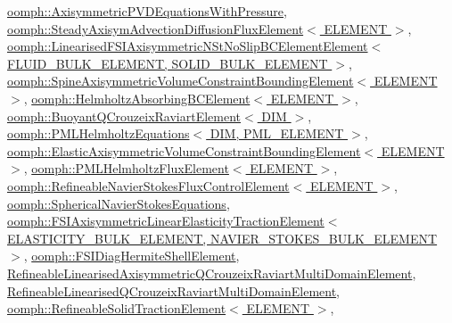 \hyperlink{classoomph_1_1AxisymmetricPVDEquationsWithPressure_a43c81b1695c9cd22b7546dd7764b70bd}{oomph\+::\+Axisymmetric\+P\+V\+D\+Equations\+With\+Pressure}, \hyperlink{classoomph_1_1SteadyAxisymAdvectionDiffusionFluxElement_aa23b0478cb2937ac6e0668136befac27}{oomph\+::\+Steady\+Axisym\+Advection\+Diffusion\+Flux\+Element$<$ E\+L\+E\+M\+E\+N\+T $>$}, \hyperlink{classoomph_1_1LinearisedFSIAxisymmetricNStNoSlipBCElementElement_ad03af0befd909bc87f3bd5e8fb93c97b}{oomph\+::\+Linearised\+F\+S\+I\+Axisymmetric\+N\+St\+No\+Slip\+B\+C\+Element\+Element$<$ F\+L\+U\+I\+D\+\_\+\+B\+U\+L\+K\+\_\+\+E\+L\+E\+M\+E\+N\+T, S\+O\+L\+I\+D\+\_\+\+B\+U\+L\+K\+\_\+\+E\+L\+E\+M\+E\+N\+T $>$}, \hyperlink{classoomph_1_1SpineAxisymmetricVolumeConstraintBoundingElement_a5813860802c0474ef6ff5f249ca7141f}{oomph\+::\+Spine\+Axisymmetric\+Volume\+Constraint\+Bounding\+Element$<$ E\+L\+E\+M\+E\+N\+T $>$}, \hyperlink{classoomph_1_1HelmholtzAbsorbingBCElement_a2ddc7be679d396847964aed6d545e168}{oomph\+::\+Helmholtz\+Absorbing\+B\+C\+Element$<$ E\+L\+E\+M\+E\+N\+T $>$}, \hyperlink{classoomph_1_1BuoyantQCrouzeixRaviartElement_a7bd9313dd697c1219cee4a65692388b5}{oomph\+::\+Buoyant\+Q\+Crouzeix\+Raviart\+Element$<$ D\+I\+M $>$}, \hyperlink{classoomph_1_1PMLHelmholtzEquations_a93c2495dc0dd513b51ef77b2e3a7020a}{oomph\+::\+P\+M\+L\+Helmholtz\+Equations$<$ D\+I\+M, P\+M\+L\+\_\+\+E\+L\+E\+M\+E\+N\+T $>$}, \hyperlink{classoomph_1_1ElasticAxisymmetricVolumeConstraintBoundingElement_adc7f5296f867251fe4b97b01f40c11e7}{oomph\+::\+Elastic\+Axisymmetric\+Volume\+Constraint\+Bounding\+Element$<$ E\+L\+E\+M\+E\+N\+T $>$}, \hyperlink{classoomph_1_1PMLHelmholtzFluxElement_a1d3dd847de79b9758b9bdd40dcbcda3c}{oomph\+::\+P\+M\+L\+Helmholtz\+Flux\+Element$<$ E\+L\+E\+M\+E\+N\+T $>$}, \hyperlink{classoomph_1_1RefineableNavierStokesFluxControlElement_a46659967091dc0f672d91f2ac339c304}{oomph\+::\+Refineable\+Navier\+Stokes\+Flux\+Control\+Element$<$ E\+L\+E\+M\+E\+N\+T $>$}, \hyperlink{classoomph_1_1SphericalNavierStokesEquations_a518de36d4b06dcd38ab7e18a89f40e9f}{oomph\+::\+Spherical\+Navier\+Stokes\+Equations}, \hyperlink{classoomph_1_1FSIAxisymmetricLinearElasticityTractionElement_ac2ec9591abe96af1cc68da123c554feb}{oomph\+::\+F\+S\+I\+Axisymmetric\+Linear\+Elasticity\+Traction\+Element$<$ E\+L\+A\+S\+T\+I\+C\+I\+T\+Y\+\_\+\+B\+U\+L\+K\+\_\+\+E\+L\+E\+M\+E\+N\+T, N\+A\+V\+I\+E\+R\+\_\+\+S\+T\+O\+K\+E\+S\+\_\+\+B\+U\+L\+K\+\_\+\+E\+L\+E\+M\+E\+N\+T $>$}, \hyperlink{classoomph_1_1FSIDiagHermiteShellElement_a5e48d1c0291cf16cacaa8b42112efe90}{oomph\+::\+F\+S\+I\+Diag\+Hermite\+Shell\+Element}, \hyperlink{classRefineableLinearisedAxisymmetricQCrouzeixRaviartMultiDomainElement_a5040c64ce7752b950ee33fa18e8eb7c1}{Refineable\+Linearised\+Axisymmetric\+Q\+Crouzeix\+Raviart\+Multi\+Domain\+Element}, \hyperlink{classRefineableLinearisedQCrouzeixRaviartMultiDomainElement_a0ee5de787e1dfe477236eef98fc46092}{Refineable\+Linearised\+Q\+Crouzeix\+Raviart\+Multi\+Domain\+Element}, \hyperlink{classoomph_1_1RefineableSolidTractionElement_ad1921c9d88c2d71c0f3735259faaef35}{oomph\+::\+Refineable\+Solid\+Traction\+Element$<$ E\+L\+E\+M\+E\+N\+T $>$}, 
